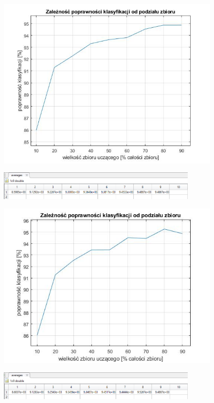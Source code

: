 \documentclass[a4paper, 12pt]{report}
\begin{document}
\begin{figure}[hbt!]
\includegraphics[width=12cm]{podzial1}
\centering
\end{figure}

\begin{figure}[hbt!]
\includegraphics[width=10cm]{podzial1 dane}
\centering
\end{figure}

\begin{figure}[hbt!]
\includegraphics[width=12cm]{podzial2}
\centering
\end{figure}

\begin{figure}[hbt!]
\includegraphics[width=10cm]{podzial2 dane}
\centering
\end{figure}
\end{document}
